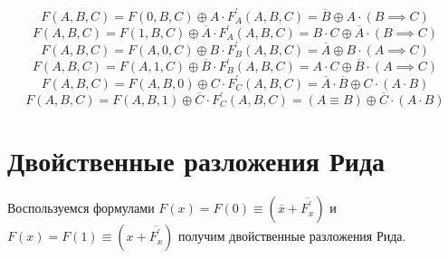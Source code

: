 \documentclass[a4paper,10pt]{article} %
\begin{document}
	\begin{equation}
		F(A, B, C) = F(0, B, C) \oplus A \cdot F_{A}^{\prime}(A, B, C) =
		\overline{B} \oplus A \cdot (B \implies C) 
	\end{equation}
	\begin{equation}
		F(A, B, C) = F(1, B, C) \oplus \overline{A} \cdot F_{A}^{\prime}(A, B, C) =
		B \cdot C \oplus \overline{A} \cdot (B \implies C)
	\end{equation}
	\begin{equation}
		F(A, B, C) = F(A, 0, C) \oplus B \cdot F_{B}^{\prime}(A, B, C) =
		\overline{A} \oplus B \cdot (A \implies C)
	\end{equation}
	\begin{equation}
		F(A, B, C) = F(A, 1, C) \oplus \overline{B} \cdot F_{B}^{\prime}(A, B, C) =
		A \cdot C \oplus \overline{B} \cdot (A \implies C)
	\end{equation}
	\begin{equation}
		F(A, B, C) = F(A, B, 0) \oplus C \cdot F_{C}^{\prime}(A, B, C) =
		\overline{A} \cdot \overline{B} \oplus C \cdot (A \cdot B)
	\end{equation}
	\begin{equation}
		F(A, B, C) = F(A, B, 1) \oplus \overline{C} \cdot F_{C}^{\prime}(A, B, C) =
		(A \equiv B) \oplus \overline{C} \cdot (A \cdot B) 
	\end{equation}

	\section{Двойственные разложения Рида}
		
	Воспользуемся формулами $F(x) = F(0) \equiv (\overline{x} + \overline{F_{x}^{\prime}})$ и $F(x) = F(1) \equiv (x + \overline{F_{x}^{\prime}})$ получим двойственные разложения Рида.
	
\end{document}

